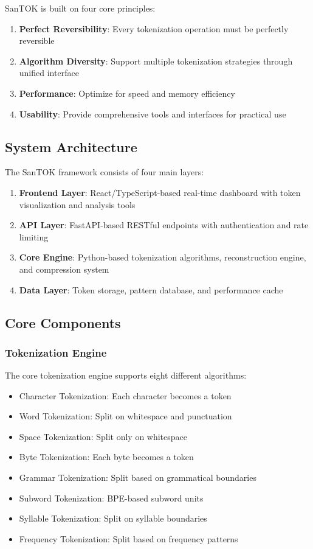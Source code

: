 \documentclass[conference]{IEEEtran}
\begin{document}
SanTOK is built on four core principles:

\begin{enumerate}
    \item \textbf{Perfect Reversibility}: Every tokenization operation must be perfectly reversible
    \item \textbf{Algorithm Diversity}: Support multiple tokenization strategies through unified interface
    \item \textbf{Performance}: Optimize for speed and memory efficiency
    \item \textbf{Usability}: Provide comprehensive tools and interfaces for practical use
\end{enumerate}

\subsection{System Architecture}

The SanTOK framework consists of four main layers:

\begin{enumerate}
    \item \textbf{Frontend Layer}: React/TypeScript-based real-time dashboard with token visualization and analysis tools
    \item \textbf{API Layer}: FastAPI-based RESTful endpoints with authentication and rate limiting
    \item \textbf{Core Engine}: Python-based tokenization algorithms, reconstruction engine, and compression system
    \item \textbf{Data Layer}: Token storage, pattern database, and performance cache
\end{enumerate}

\subsection{Core Components}

\subsubsection{Tokenization Engine}

The core tokenization engine supports eight different algorithms:

\begin{itemize}
    \item Character Tokenization: Each character becomes a token
    \item Word Tokenization: Split on whitespace and punctuation
    \item Space Tokenization: Split only on whitespace
    \item Byte Tokenization: Each byte becomes a token
    \item Grammar Tokenization: Split based on grammatical boundaries
    \item Subword Tokenization: BPE-based subword units
    \item Syllable Tokenization: Split on syllable boundaries
    \item Frequency Tokenization: Split based on frequency patterns
\end{itemize}
\end{document}
